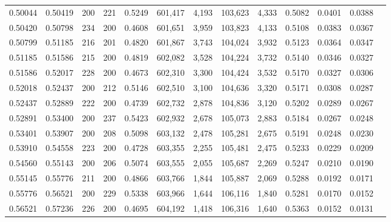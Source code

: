 \begin{tabular}{rrrrrrrrrrrrr}
0.50044 & 0.50419 &   200 & 221 &                                     0.5249 & 601,417 &   4,193 & 103,623 &   4,333 & 0.5082 & 0.0401 & 0.0388 \\
0.50420 & 0.50798 &   234 & 200 &                                     0.4608 & 601,651 &   3,959 & 103,823 &   4,133 & 0.5108 & 0.0383 & 0.0367 \\
0.50799 & 0.51185 &   216 & 201 &                                     0.4820 & 601,867 &   3,743 & 104,024 &   3,932 & 0.5123 & 0.0364 & 0.0347 \\
0.51185 & 0.51586 &   215 & 200 &                                     0.4819 & 602,082 &   3,528 & 104,224 &   3,732 & 0.5140 & 0.0346 & 0.0327 \\
0.51586 & 0.52017 &   228 & 200 &                                     0.4673 & 602,310 &   3,300 & 104,424 &   3,532 & 0.5170 & 0.0327 & 0.0306 \\
0.52018 & 0.52437 &   200 & 212 &                                     0.5146 & 602,510 &   3,100 & 104,636 &   3,320 & 0.5171 & 0.0308 & 0.0287 \\
0.52437 & 0.52889 &   222 & 200 &                                     0.4739 & 602,732 &   2,878 & 104,836 &   3,120 & 0.5202 & 0.0289 & 0.0267 \\
0.52891 & 0.53400 &   200 & 237 &                                     0.5423 & 602,932 &   2,678 & 105,073 &   2,883 & 0.5184 & 0.0267 & 0.0248 \\
0.53401 & 0.53907 &   200 & 208 &                                     0.5098 & 603,132 &   2,478 & 105,281 &   2,675 & 0.5191 & 0.0248 & 0.0230 \\
0.53910 & 0.54558 &   223 & 200 &                                     0.4728 & 603,355 &   2,255 & 105,481 &   2,475 & 0.5233 & 0.0229 & 0.0209 \\
0.54560 & 0.55143 &   200 & 206 &                                     0.5074 & 603,555 &   2,055 & 105,687 &   2,269 & 0.5247 & 0.0210 & 0.0190 \\
0.55145 & 0.55776 &   211 & 200 &                                     0.4866 & 603,766 &   1,844 & 105,887 &   2,069 & 0.5288 & 0.0192 & 0.0171 \\
0.55776 & 0.56521 &   200 & 229 &                                     0.5338 & 603,966 &   1,644 & 106,116 &   1,840 & 0.5281 & 0.0170 & 0.0152 \\
0.56521 & 0.57236 &   226 & 200 &                                     0.4695 & 604,192 &   1,418 & 106,316 &   1,640 & 0.5363 & 0.0152 & 0.0131 \\

\end{tabular}
